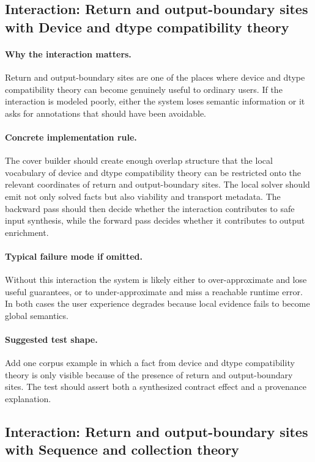 \documentclass[11pt]{report}
\theoremstyle{definition}
\theoremstyle{plain}
\begin{document}
\subsection{Interaction: Return and output-boundary sites with Device and dtype compatibility theory}

\paragraph{Why the interaction matters.}
Return and output-boundary sites are one of the places where device and dtype compatibility theory can become
genuinely useful to ordinary users. If the interaction is modeled poorly,
either the system loses semantic information or it asks for annotations that
should have been avoidable.

\paragraph{Concrete implementation rule.}
The cover builder should create enough overlap structure that the local
vocabulary of device and dtype compatibility theory can be restricted onto the relevant
coordinates of return and output-boundary sites. The local solver should emit not only
solved facts but also viability and transport metadata. The backward pass
should then decide whether the interaction contributes to safe input
synthesis, while the forward pass decides whether it contributes to output
enrichment.

\paragraph{Typical failure mode if omitted.}
Without this interaction the system is likely either to over-approximate and
lose useful guarantees, or to under-approximate and miss a reachable runtime
error. In both cases the user experience degrades because local evidence
fails to become global semantics.

\paragraph{Suggested test shape.}
Add one corpus example in which a fact from device and dtype compatibility theory is only
visible because of the presence of return and output-boundary sites. The test should
assert both a synthesized contract effect and a provenance explanation.

\subsection{Interaction: Return and output-boundary sites with Sequence and collection theory}
\end{document}
